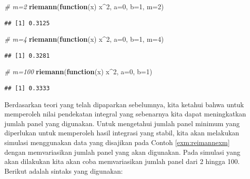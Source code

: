 \documentclass[
]{book}
\newenvironment{Shaded}{\begin{snugshade}}{\end{snugshade}}
\newcommand{\AttributeTok}[1]{\textcolor[rgb]{0.13,0.29,0.53}{#1}}
\newcommand{\CommentTok}[1]{\textcolor[rgb]{0.56,0.35,0.01}{\textit{#1}}}
\newcommand{\ControlFlowTok}[1]{\textcolor[rgb]{0.13,0.29,0.53}{\textbf{#1}}}
\newcommand{\DecValTok}[1]{\textcolor[rgb]{0.00,0.00,0.81}{#1}}
\newcommand{\FunctionTok}[1]{\textcolor[rgb]{0.13,0.29,0.53}{\textbf{#1}}}
\newcommand{\NormalTok}[1]{#1}
\newcommand{\SpecialCharTok}[1]{\textcolor[rgb]{0.81,0.36,0.00}{\textbf{#1}}}
\theoremstyle{definition}
\theoremstyle{definition}
\theoremstyle{definition}
\theoremstyle{definition}
\theoremstyle{remark}
\begin{document}
\begin{Shaded}
\begin{Highlighting}[]
\CommentTok{\# m=2}
\FunctionTok{riemann}\NormalTok{(}\ControlFlowTok{function}\NormalTok{(x) x}\SpecialCharTok{\^{}}\DecValTok{2}\NormalTok{, }\AttributeTok{a=}\DecValTok{0}\NormalTok{, }\AttributeTok{b=}\DecValTok{1}\NormalTok{, }\AttributeTok{m=}\DecValTok{2}\NormalTok{)}
\end{Highlighting}
\end{Shaded}

\begin{verbatim}
## [1] 0.3125
\end{verbatim}

\begin{Shaded}
\begin{Highlighting}[]
\CommentTok{\# m=4}
\FunctionTok{riemann}\NormalTok{(}\ControlFlowTok{function}\NormalTok{(x) x}\SpecialCharTok{\^{}}\DecValTok{2}\NormalTok{, }\AttributeTok{a=}\DecValTok{0}\NormalTok{, }\AttributeTok{b=}\DecValTok{1}\NormalTok{, }\AttributeTok{m=}\DecValTok{4}\NormalTok{)}
\end{Highlighting}
\end{Shaded}

\begin{verbatim}
## [1] 0.3281
\end{verbatim}

\begin{Shaded}
\begin{Highlighting}[]
\CommentTok{\# m=100}
\FunctionTok{riemann}\NormalTok{(}\ControlFlowTok{function}\NormalTok{(x) x}\SpecialCharTok{\^{}}\DecValTok{2}\NormalTok{, }\AttributeTok{a=}\DecValTok{0}\NormalTok{, }\AttributeTok{b=}\DecValTok{1}\NormalTok{)}
\end{Highlighting}
\end{Shaded}

\begin{verbatim}
## [1] 0.3333
\end{verbatim}

Berdasarkan teori yang telah dipaparkan sebelumnya, kita ketahui bahwa untuk memperoleh nilai pendekatan integral yang sebenarnya kita dapat meningkatkan jumlah panel yang digunakan. Untuk mengetahui jumlah panel minimum yang diperlukan untuk memperoleh hasil integrasi yang stabil, kita akan melakukan simulasi menggunakan data yang disajikan pada Contoh \ref{exm:reimannexm} dengan memvariasikan jumlah panel yang akan digunakan. Pada simulasi yang akan dilakukan kita akan coba memvariasikan jumlah panel dari 2 hingga 100. Berikut adalah sintaks yang digunakan:
\end{document}
